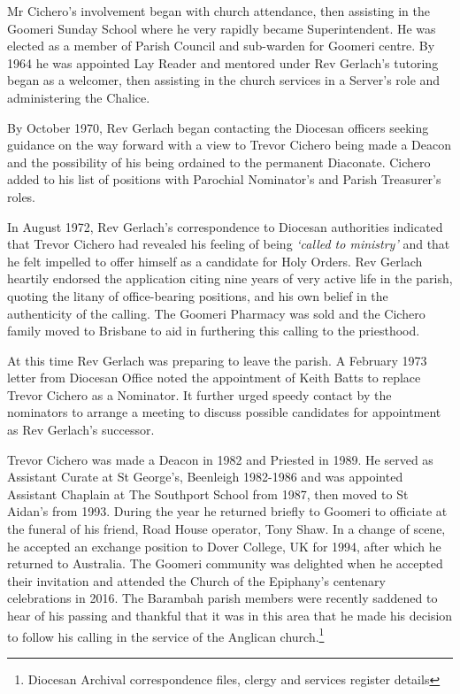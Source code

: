 Mr Cichero's involvement began with church attendance, then assisting in the Goomeri Sunday School where he very rapidly became Superintendent. He was elected as a member of Parish Council and sub-warden for Goomeri centre. By 1964 he was appointed Lay Reader and mentored under Rev Gerlach's tutoring began as a welcomer, then assisting in the church services in a Server's role and administering the Chalice.



By October 1970, Rev Gerlach began contacting the Diocesan officers seeking guidance on the way forward with a view to Trevor Cichero being made a Deacon and the possibility of his being ordained to the permanent Diaconate. Cichero added to his list of positions with Parochial Nominator's and Parish Treasurer's roles.



In August 1972, Rev Gerlach's correspondence to Diocesan authorities indicated that Trevor Cichero had revealed his feeling of being \emph{`called to ministry'} and that he felt impelled to offer himself as a candidate for Holy Orders. Rev Gerlach heartily endorsed the application citing nine years of very active life in the parish, quoting the litany of office-bearing positions, and his own belief in the authenticity of the calling. The Goomeri Pharmacy was sold and the Cichero family moved to Brisbane to aid in furthering this calling to the priesthood.



At this time Rev Gerlach was preparing to leave the parish. A February 1973 letter from Diocesan Office noted the appointment of Keith Batts to replace Trevor Cichero as a Nominator. It further urged speedy contact by the nominators to arrange a meeting to discuss possible candidates for appointment as Rev Gerlach's successor.



Trevor Cichero was made a Deacon in 1982 and Priested in 1989. He served as Assistant Curate at St George's, Beenleigh 1982-1986 and was appointed Assistant Chaplain at The Southport School from 1987, then moved to St Aidan's from 1993. During the year he returned briefly to Goomeri to officiate at the funeral of his friend, Road House operator, Tony Shaw. In a change of scene, he accepted an exchange position to Dover College, UK for 1994, after which he returned to Australia. The Goomeri community was delighted when he accepted their invitation and attended the Church of the Epiphany's centenary celebrations in 2016. The Barambah parish members were recently saddened to hear of his passing and thankful that it was in this area that he made his decision to follow his calling in the service of the Anglican church.\footnote{Diocesan Archival correspondence files, clergy and services register details}


